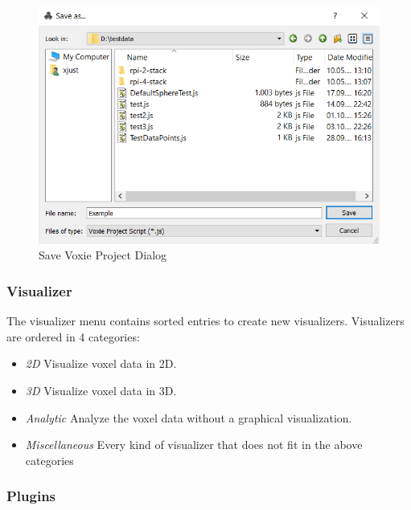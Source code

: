 \begin{figure}[!htbp]
  \centering
  \includegraphics[width=1.0\textwidth]{img/save-dialog.png}
  \caption{Save Voxie Project Dialog}
  \label{save-dialog}
\end{figure}




\subsubsection{Visualizer}

The visualizer menu contains sorted entries to create new visualizers.
Visualizers are ordered in 4 categories:
\begin{itemize}
  \item{\emph{2D} \newline Visualize voxel data in 2D.}
  \item{\emph{3D} \newline Visualize voxel data in 3D.}
  \item{\emph{Analytic} \newline Analyze the voxel data without a graphical visualization.}
  \item{\emph{Miscellaneous} \newline Every kind of visualizer that does not fit
    in the above categories }
\end{itemize}

\subsubsection{Plugins}

